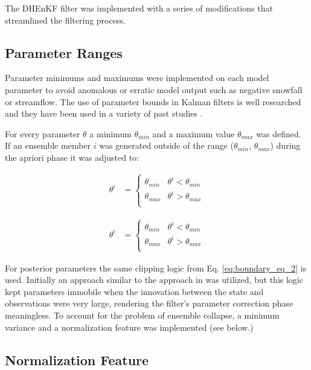 The DHEnKF filter was implemented with a series of modifications that streamlined the filtering process.

\subsection{Parameter Ranges}

Parameter minimums and maximums were implemented on each model parameter to avoid anomalous or erratic model output such as negative snowfall or streamflow. The use of parameter bounds in Kalman filters is well researched and they have been used in a variety of past studies \cite{Shi2014}.


For every parameter $\theta$ a minimum $\theta_{min}$ and a maximum value $\theta_{max}$ was defined. If an ensemble member $i$ was generated outside of the range ($\theta_{min}$, $\theta_{max}$) during the apriori phase it was adjusted to:



\begin{align}\label{eq:boundary_eq}
\theta^{i} &= \left\{
\begin{array}{ll}
\theta_{min} & \theta^{i} < \theta_{min} \\
\theta_{max} &  \theta^{i} > \theta_{max} \\
\end{array}
\right.
\end{align}

\begin{align}\label{eq:boundary_eq_2}
\theta^{i} &= \left\{
\begin{array}{ll}
\theta_{min} & \theta^{i} < \theta_{min} \\
\theta_{max} &  \theta^{i} > \theta_{max} \\
\end{array}
\right.
\end{align}

For posterior parameters the same clipping logic from Eq. \eqref{eq:boundary_eq_2} is used. Initially an approach similar to the approach in \cite{Shi2014} was utilized, but this logic kept parameters immobile when the innovation between the state and observations were very large, rendering the filter's parameter correction phase  meaningless. To account for the problem of ensemble collapse, a minimum variance and a normalization feature was implemented (see below.)

\subsection{Normalization Feature}

